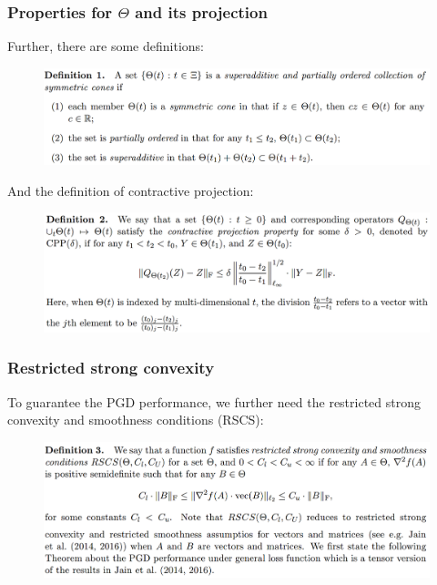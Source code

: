 \documentclass{beamer}
\begin{document}
	
	\begin{frame}
		\frametitle{Properties for $\Theta$ and its projection}
		Further, there are some definitions:
		\begin{figure}
			\includegraphics[width=.9\linewidth]{image013.png}
		\end{figure}
		And the definition of contractive projection:
		\begin{figure}
			\includegraphics[width=.9\linewidth]{image014.png}
		\end{figure}
	\end{frame}
	
	\begin{frame}
		\frametitle{Restricted strong convexity}
		To guarantee the PGD performance, we further need  the restricted strong convexity and smoothness conditions (RSCS):
		\begin{figure}
			\includegraphics[width=1\linewidth]{image015.png}
		\end{figure}
	\end{frame}
	
\end{document}
